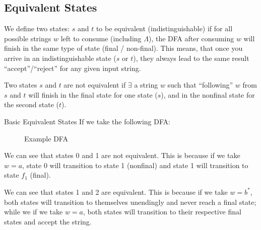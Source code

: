 \subsection{Equivalent States}
We define two states: $s$ and $t$ to be equivalent (indistinguishable) if for all possible strings $w$ left to consume (including $\Lambda$), the DFA after consuming $w$ will finish in the same type of state (final / non-final). This means, that once you arrive in an indistinguishable state ($s$ or $t$), they always lead to the same result ``accept''/``reject'' for any given input string.

Two states $s$ and $t$ are not equivalent if $\exists$ a string $w$ such that ``following'' $w$ from $s$ and $t$ will finish in the final state for one state ($s$), and in the nonfinal state for the second state ($t$). 

\begin{example}{Basic Equivalent States}
If we take the following DFA:

\begin{figure}[H]
    \centering
    \caption{Example DFA}
    \label{fig:dfa-equivalent-state-eg-1-a}
\end{figure}

We can see that states 0 and 1 are not equivalent. This is because if we take $w=a$, state 0 will transition to state 1 (nonfinal) and state 1 will transition to state $f_1$ (final). 

We can see that states 1 and 2 are equivalent. This is because if we take $w=b^*$, both states will transition to themselves unendingly and never reach a final state; while we if we take $w=a$, both states will transition to their respective final states and accept the string. 

\end{example}

